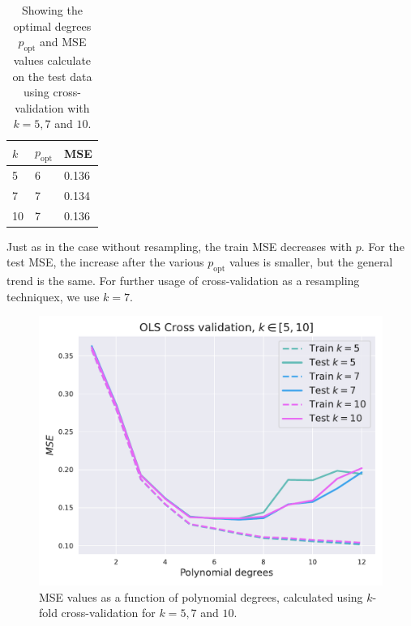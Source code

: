 \documentclass[twocolumn,english,notitlepage]{article}
\newcommand{\msub}[2]{\ensuremath{{#1}_\text{#2}}}
\begin{document}
            \begin{table}[ht]
                \centering
                \begin{tabular}{l|ll}
                $k$ & $\msub{p}{opt}$ & MSE \\
                \hline
                5   & 6         & 0.136 \\
                7   & 7         & 0.134 \\
                10  & 7         & 0.136
                \end{tabular}
                \caption{Showing the optimal degrees $\msub{p}{opt}$ and MSE values calculate on the test data using cross-validation with $k = 5, 7$ and $10$.}
                \label{res:tab:OLS_kfold_optimal}
            \end{table}
            
            Just as in the case without resampling, the train MSE decreases with $p$. For the test MSE, the increase after the various $\msub{p}{opt}$ values is smaller, but the general trend is the same. For further usage of cross-validation as a resampling techniquex, we use $k = 7$.   
            
            \begin{figure}[ht]
                \centering
                \includegraphics[width=.9\linewidth]{OLS_mse_kfold.pdf}
                \caption{MSE values as a function of polynomial degrees, calculated using $k$-fold cross-validation for $k = 5, 7$ and $10$. }
                \label{res:fig:OLS_mse_kfold}
            \end{figure}
        
\end{document}
